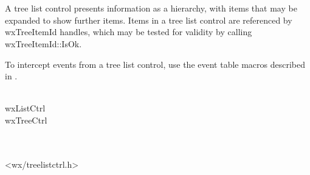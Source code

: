 \section{}\label{wxtreelistctrl}

A tree list control presents information as a hierarchy, with items that may be expanded
to show further items. Items in a tree list control are referenced by wxTreeItemId handles,
which may be tested for validity by calling wxTreeItemId::IsOk.

To intercept events from a tree list control, use the event table macros described in .


\\
wxListCtrl\\
wxTreeCtrl\\
\\
\\


<wx/treelistctrl.h>


